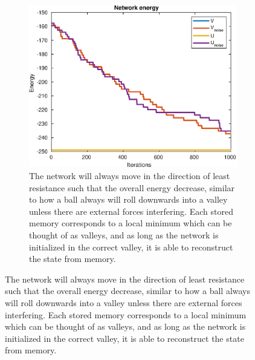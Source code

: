 \begin{figure}[H]
\begin{subfigure}{0.49\textwidth}
        \includegraphics[width=\textwidth]{figs/multiple-patterns-energy.eps}
        \caption{The network will always move in the direction of least resistance such that the overall energy decrease, similar to how a ball always will roll downwards into a valley unless there are external forces interfering. Each stored memory corresponds to a local minimum which can be thought of as valleys, and as long as the network is initialized in the correct valley, it is able to reconstruct the state from memory.}
    \end{subfigure}
\end{figure}
 

